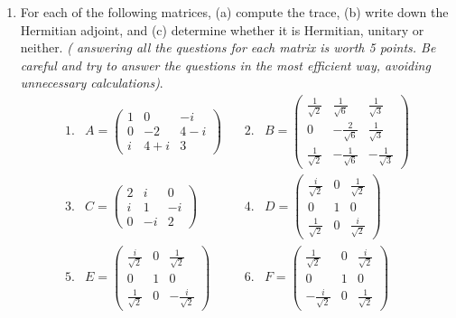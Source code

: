 \documentclass[fleqn]{article}
\begin{document}
\begin{enumerate}
  \item  For each of the following matrices, (a) compute the trace, (b) write down the Hermitian adjoint, and (c) determine whether it is Hermitian, unitary or neither. \emph{( answering all the questions for each matrix is worth 5 points. Be careful and try to answer the questions in the most efficient way, avoiding unnecessary calculations)}. 
    \[
    \begin{array}{ccccc}
    1. & A=\left( 
    \begin{array}{ccc}
    1 & 0 & -i \\ 
    0 & -2 & 4-i \\ 
    i & 4+i & 3
    \end{array}
    \right)  & \, & 2. & B=\left( 
    \begin{array}{ccc}
    \frac{1}{\sqrt{2}} & \frac{1}{\sqrt{6}} & \frac{1}{\sqrt{3}} \\ 
    0 & -\frac{2}{\sqrt{6}} & \frac{1}{\sqrt{3}} \\ 
    \frac{1}{\sqrt{2}} & -\frac{1}{\sqrt{6}} & -\frac{1}{\sqrt{3}}
    \end{array}
    \right)  \\ 
    3. & C=\left( 
    \begin{array}{lll}
    2 & i & 0 \\ 
    i & 1 & -i \\ 
    0 & -i & 2
    \end{array}
    \right)  & \, & 4. & D=\left( 
    \begin{array}{ccc}
    \frac{i}{\sqrt{2}} & 0 & \frac{1}{\sqrt{2}} \\ 
    0 & 1 & 0 \\ 
    \frac{1}{\sqrt{2}} & 0 & \frac{i}{\sqrt{2}}
    \end{array}
    \right)  \\ 
    5. & E=\left( 
    \begin{array}{ccc}
    \frac{i}{\sqrt{2}} & 0 & \frac{1}{\sqrt{2}} \\ 
    0 & 1 & 0 \\ 
    \frac{1}{\sqrt{2}} & 0 & -\frac{i}{\sqrt{2}}
    \end{array}
    \right)  & \, & 6. & F=\left( 
    \begin{array}{ccc}
    \frac{1}{\sqrt{2}} & 0 & \frac{i}{\sqrt{2}} \\ 
    0 & 1 & 0 \\ 
    -\frac{i}{\sqrt{2}} & 0 & \frac{1}{\sqrt{2}}
    \end{array}
    \right) 
    \end{array}
    \]


\end{enumerate}
\end{document}
